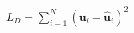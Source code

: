 \documentclass[preview]{standalone}
\begin{document}
\begin{align*}
L_D = \sum_{i=1}^N \left(\mathbf{u}_i - \hat{\mathbf{u}}_i\right)^2
\end{align*}
\end{document}
